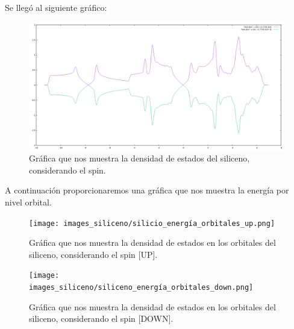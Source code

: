 \vspace{0.5cm}

Se llegó al siguiente gráfico:

\begin{figure}[H]
    \centering
    \includegraphics[scale=0.38]{images_siliceno/densidad_estados_con_spin.png}
    \caption{Gráfica que nos muestra la densidad de estados del siliceno, considerando el spin.}
\end{figure}

A continuación proporcionaremos una gráfica que nos muestra la energía por nivel orbital.

\begin{figure}[H]
    \centering
    \texttt{[image: images\_siliceno/silicio\_energía\_orbitales\_up.png]}
    \caption{Gráfica que nos muestra la densidad de estados en los orbitales del siliceno, considerando el spin [UP].}
\end{figure}

\begin{figure}[H]
    \centering
    \texttt{[image: images\_siliceno/siliceno\_energía\_orbitales\_down.png]}
    \caption{Gráfica que nos muestra la densidad de estados en los orbitales del siliceno, considerando el spin [DOWN].}
\end{figure}

\newpage